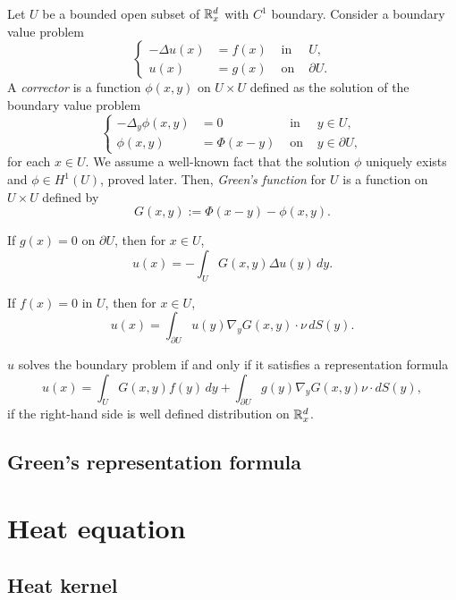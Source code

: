 \documentclass{../note}
\begin{document}
\begin{prb}
Let $U$ be a bounded open subset of $\mathbb{R}_x^d$ with $C^1$ boundary.
Consider a boundary value problem
\[\left\{\begin{alignedat}{2}
-\Delta u(x)&=f(x) & \text{ in }&U,\\
u(x)&=g(x) & \text{ on }&\partial U.
\end{alignedat}\right.\]
A \emph{corrector} is a function $\phi(x,y)$ on $U\times U$ defined as the solution of the boundary value problem
\[\left\{\begin{alignedat}{2}
-\Delta_y\phi(x,y)&=0 & \text{ in }&y\in U,\\
\phi(x,y)&=\Phi(x-y) & \text{ on }&y\in\partial U,
\end{alignedat}\right.\]
for each $x\in U$.
We assume a well-known fact that the solution $\phi$ uniquely exists and $\phi\in H^1(U)$, proved later.
Then, \emph{Green's function} for $U$ is a function on $U\times U$ defined by
\[G(x,y):=\Phi(x-y)-\phi(x,y).\]
\begin{parts}
\item If $g(x)=0$ on $\partial U$, then for $x\in U$,
\[u(x)=-\int_UG(x,y)\Delta u(y)\,dy.\]
\item If $f(x)=0$ in $U$, then for $x\in U$,
\[u(x)=\int_{\partial U}u(y)\nabla_yG(x,y)\cdot\nu\,dS(y).\]
\item $u$ solves the boundary problem if and only if it satisfies a representation formula
\[u(x)=\int_UG(x,y)f(y)\,dy+\int_{\partial U}g(y)\nabla_yG(x,y)\nu\cdot dS(y),\]
if the right-hand side is well defined distribution on $\mathbb{R}_x^d$.
\end{parts}
\end{prb}
\begin{pf}
\end{pf}


\section{Green's representation formula}







\chapter{Heat equation}
\section{Heat kernel}
\end{document}
